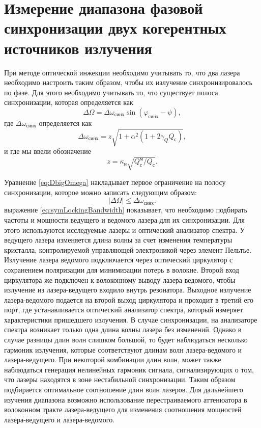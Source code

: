 \section{Измерение диапазона фазовой синхронизации двух когерентных источников излучения}\label{sec:ch2/sect2}
При методе оптической инжекции необходимо учитывать то, что два лазера необходимо настроить таким образом, чтобы их излучение синхронизировалось по фазе. Для этого необходимо учитывать то, что существует полоса синхронизации, которая определяется как 
\begin{equation}\label{eq:DbigOmega}
	\Delta \Omega=\Delta \omega_{\text{синх}} \sin(\varphi_{\text{синх}}-\psi),
\end{equation}
где $\Delta \omega_{\text{синх}}$ определяется как
\begin{equation}\label{eq:lockingBandwidth}
	\Delta \omega_{\text{синх}} = z\sqrt{1+\alpha^2(1+2\gamma_Q Q_\text{с})},
\end{equation}
и где мы ввели обозначение
\begin{equation}\label{eq:z}
	z=\kappa_{\text{и}}\sqrt{Q^{\text{м}}_\text{с}/Q_\text{с}}.
\end{equation}

Уравнение \eqref{eq:DbigOmega} накладывает первое ограничение на полосу синхронизации, которое можно записать следующим образом:
\begin{equation}\label{eq:symLockingBandwidth}
	\lvert \Delta \Omega \rvert \le\Delta \omega_{\text{синх}}.
\end{equation}
выражение \ref{eq:symLockingBandwidth} показывает, что необходимо подбирать частоты и мощности ведущего и ведомого лазера для их синхронизации. 
\newline Для этого используются исследуемые лазеры и оптический анализатор спектра. У ведущего лазера изменяется длина волны за счет изменения температуры кристалла, контролируемой управляющей электроникой через элемент Пельтье. Излучение лазера ведомого подключается через оптический циркулятор с сохранением поляризации для минимизации потерь в волокне. Второй вход циркулятора же подключен к волоконному выводу лазера-ведомого, чтобы излучение из лазера-ведущего входило внутрь резонатора. Выходное излучение лазера-ведомого подается на второй выход циркулятора и проходит в третий его порт, где устанавливается оптический анализатор спектра, который измеряет характеристики пришедшего излучения. В случае синхронизации, на анализаторе спектра возникает только одна длина волны лазера без изменений. Однако в случае разницы длин волн слишком большой, то будет наблюдаться несколько гармоник излучения, которые соответствуют длинам волн лазера-ведомого и лазера-ведущего. При некоторой комбинации длин волн, может также наблюдаться генерация нелинейных гармоник сигнала, сигнализирующих о том, что лазеры находятся в зоне нестабильной синхронизации. 
Таким образом подбирается оптимальное соотношение длин волн лазеров. Для дальнейшего изучения диапазона возможно использование перестраиваемого аттенюатора в волоконном тракте лазера-ведущего для изменения соотношения мощностей лазера-ведущего и лазера-ведомого.
